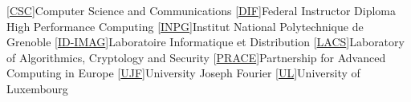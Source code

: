 \documentclass{cv}
\begin{document}

\ifShortOrFull{
  \vspace*{-1em}
  
}



\unlesstinycv{
  \ifShortOrFull{
    
  }

  \iffullcv{
    
  }
  \ifshortcv{}

  

  \iffullcv{}


  

  \ifShortOrFull{
    \iffullcv{\clearpage}
    
    \ifshortcv{\clearpage}
  }

}




\begin{acronym}
  [\href{http://csc.uni.lu}{CSC}]{Computer Science and Communications}
  [\href{http://www.ffkama.fr/direction-technique/formation/formationsfederales.php}{DIF}]{Federal Instructor Diploma}
   {High Performance Computing}
  [\href{http://www.grenoble-inp.fr/}{INPG}]{Institut National Polytechnique de Grenoble}
  [\href{http://www-id.imag.fr}{ID-IMAG}]{Laboratoire Informatique et Distribution}
  [\href{http://lacs.uni.lu}{LACS}]{Laboratory of Algorithmics, Cryptology and Security}
  [\href{http://www.prace-ri.eu/}{PRACE}]{Partnership for Advanced Computing in Europe}
  [\href{http://www.ujf-grenoble.fr/}{UJF}]{University Joseph Fourier}
  [\href{http://www.uni.lu}{UL}]{University of Luxembourg}
\end{acronym}
\end{document}
